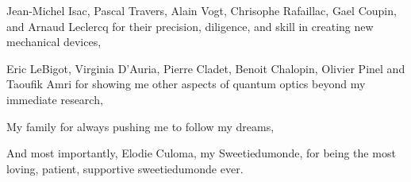 \noindent
Jean-Michel Isac, Pascal Travers, Alain Vogt, Chrisophe Rafaillac, Gael Coupin, and Arnaud Leclercq for their precision, diligence, and skill in creating new mechanical devices,

\noindent
Eric LeBigot, Virginia  D'Auria, Pierre Cladet, Benoit Chalopin, Olivier Pinel and Taoufik Amri for showing me other aspects of quantum optics beyond my immediate research,


\vspace{20 pt}
\noindent
My family for always pushing me to follow my dreams,

And most importantly, Elodie Culoma, my Sweetiedumonde, for being the most loving, patient, supportive sweetiedumonde ever.

\addtolength{\parskip}{-5 pt}
\addtolength{\textheight}{-20mm}
\rmfamily\normalfont
\cleardoublepage

